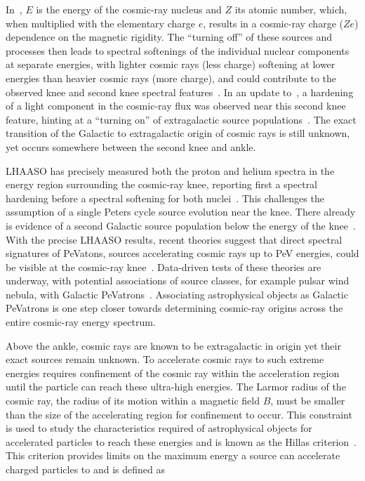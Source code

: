 In~, $E$ is the energy of the cosmic-ray nucleus and $Z$ its atomic number, which, when multiplied with the elementary charge $e$, results in a cosmic-ray charge ($Ze$) dependence on the magnetic rigidity.
The ``turning off'' of these sources and processes then leads to spectral softenings of the individual nuclear components at separate energies, with lighter cosmic rays (less charge) softening at lower energies than heavier cosmic rays (more charge), and could contribute to the observed knee and second knee spectral features~\cite{kascade_astropartphys2005_knee, kascadegrande_prl2011_secondknee}.
In an update to~\cite{kascadegrande_prl2011_secondknee}, a hardening of a light component in the cosmic-ray flux was observed near this second knee feature, hinting at a ``turning on'' of extragalactic source populations~\cite{kascadegrande_prd2013_secondknee}.
The exact transition of the Galactic to extragalactic origin of cosmic rays is still unknown, yet occurs somewhere between the second knee and ankle.


LHAASO has precisely measured both the proton and helium spectra in the energy region surrounding the cosmic-ray knee, reporting first a spectral hardening before a spectral softening for both nuclei~\cite{lhaaso_scib2025_protonknee, lhaaso_prl2025_heliumknee}.
This challenges the assumption of a single Peters cycle source evolution near the knee.
There already is evidence of a second Galactic source population below the energy of the knee~\cite{aharonian_apj2026_galacticcr}.
With the precise LHAASO results, recent theories suggest that direct spectral signatures of PeVatons, sources accelerating cosmic rays up to PeV energies, could be visible at the cosmic-ray knee~\cite{fang_apjl2026_pevatrons}.
Data-driven tests of these theories are underway, with potential associations of source classes, for example pulsar wind nebula, with Galactic PeVatrons~\cite{dikerby_apj2025_pwn}.
Associating astrophysical objects as Galactic PeVatrons is one step closer towards determining cosmic-ray origins across the entire cosmic-ray energy spectrum.

Above the ankle, cosmic rays are known to be extragalactic in origin yet their exact sources remain unknown.
To accelerate cosmic rays to such extreme energies requires confinement of the cosmic ray within the acceleration region until the particle can reach these ultra-high energies.
The Larmor radius of the cosmic ray, the radius of its motion within a magnetic field $B$, must be smaller than the size of the accelerating region for confinement to occur. 
This constraint is used to study the characteristics required of astrophysical objects for accelerated particles to reach these energies and is known as the Hillas criterion~\cite{hillas_criterion_1984}.
This criterion provides limits on the maximum energy a source can accelerate charged particles to and is defined as

